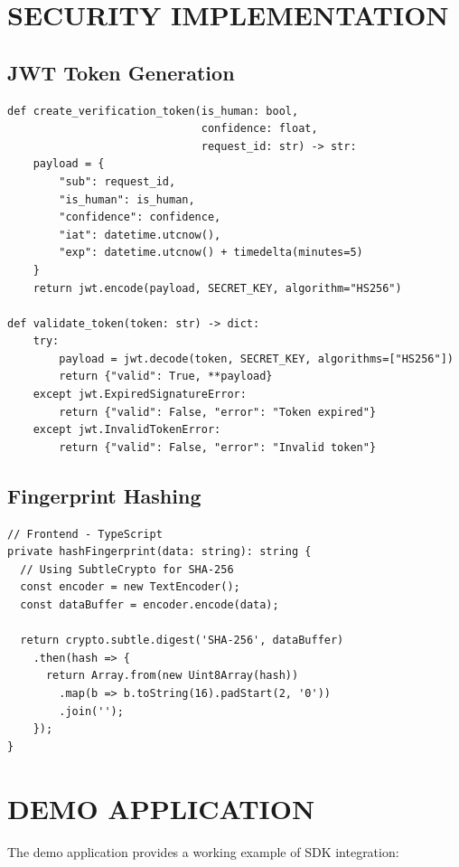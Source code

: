 \section{SECURITY IMPLEMENTATION}

\subsection{JWT Token Generation}

\begin{verbatim}
def create_verification_token(is_human: bool, 
                              confidence: float,
                              request_id: str) -> str:
    payload = {
        "sub": request_id,
        "is_human": is_human,
        "confidence": confidence,
        "iat": datetime.utcnow(),
        "exp": datetime.utcnow() + timedelta(minutes=5)
    }
    return jwt.encode(payload, SECRET_KEY, algorithm="HS256")

def validate_token(token: str) -> dict:
    try:
        payload = jwt.decode(token, SECRET_KEY, algorithms=["HS256"])
        return {"valid": True, **payload}
    except jwt.ExpiredSignatureError:
        return {"valid": False, "error": "Token expired"}
    except jwt.InvalidTokenError:
        return {"valid": False, "error": "Invalid token"}
\end{verbatim}

\subsection{Fingerprint Hashing}

\begin{verbatim}
// Frontend - TypeScript
private hashFingerprint(data: string): string {
  // Using SubtleCrypto for SHA-256
  const encoder = new TextEncoder();
  const dataBuffer = encoder.encode(data);
  
  return crypto.subtle.digest('SHA-256', dataBuffer)
    .then(hash => {
      return Array.from(new Uint8Array(hash))
        .map(b => b.toString(16).padStart(2, '0'))
        .join('');
    });
}
\end{verbatim}

\section{DEMO APPLICATION}

The demo application provides a working example of SDK integration:

